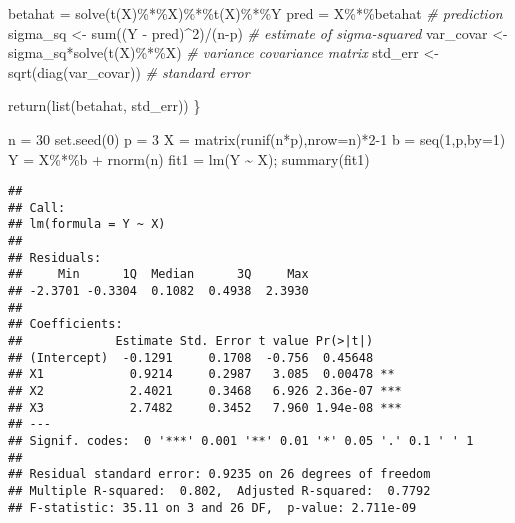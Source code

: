 \documentclass[
  11pt,
]{article}
\newenvironment{Shaded}{\begin{snugshade}}{\end{snugshade}}
\newcommand{\AttributeTok}[1]{\textcolor[rgb]{0.77,0.63,0.00}{#1}}
\newcommand{\CommentTok}[1]{\textcolor[rgb]{0.56,0.35,0.01}{\textit{#1}}}
\newcommand{\DecValTok}[1]{\textcolor[rgb]{0.00,0.00,0.81}{#1}}
\newcommand{\FunctionTok}[1]{\textcolor[rgb]{0.00,0.00,0.00}{#1}}
\newcommand{\NormalTok}[1]{#1}
\newcommand{\OtherTok}[1]{\textcolor[rgb]{0.56,0.35,0.01}{#1}}
\newcommand{\SpecialCharTok}[1]{\textcolor[rgb]{0.00,0.00,0.00}{#1}}
\begin{document}
\begin{Shaded}
\begin{Highlighting}[]
\NormalTok{  betahat }\OtherTok{=} \FunctionTok{solve}\NormalTok{(}\FunctionTok{t}\NormalTok{(X)}\SpecialCharTok{\%*\%}\NormalTok{X)}\SpecialCharTok{\%*\%}\FunctionTok{t}\NormalTok{(X)}\SpecialCharTok{\%*\%}\NormalTok{Y}
\NormalTok{  pred }\OtherTok{=}\NormalTok{ X}\SpecialCharTok{\%*\%}\NormalTok{betahat }\CommentTok{\# prediction}
\NormalTok{  sigma\_sq }\OtherTok{\textless{}{-}} \FunctionTok{sum}\NormalTok{((Y }\SpecialCharTok{{-}}\NormalTok{ pred)}\SpecialCharTok{\^{}}\DecValTok{2}\NormalTok{)}\SpecialCharTok{/}\NormalTok{(n}\SpecialCharTok{{-}}\NormalTok{p)  }\CommentTok{\# estimate of sigma{-}squared}
\NormalTok{  var\_covar }\OtherTok{\textless{}{-}}\NormalTok{ sigma\_sq}\SpecialCharTok{*}\FunctionTok{solve}\NormalTok{(}\FunctionTok{t}\NormalTok{(X)}\SpecialCharTok{\%*\%}\NormalTok{X) }\CommentTok{\# variance covariance matrix}
\NormalTok{  std\_err }\OtherTok{\textless{}{-}} \FunctionTok{sqrt}\NormalTok{(}\FunctionTok{diag}\NormalTok{(var\_covar)) }\CommentTok{\# standard error}
  
  \FunctionTok{return}\NormalTok{(}\FunctionTok{list}\NormalTok{(betahat, std\_err))}
\NormalTok{\}}
\end{Highlighting}
\end{Shaded}

\begin{Shaded}
\begin{Highlighting}[]
\NormalTok{n }\OtherTok{=} \DecValTok{30}
\FunctionTok{set.seed}\NormalTok{(}\DecValTok{0}\NormalTok{)}
\NormalTok{p }\OtherTok{=} \DecValTok{3}
\NormalTok{X }\OtherTok{=} \FunctionTok{matrix}\NormalTok{(}\FunctionTok{runif}\NormalTok{(n}\SpecialCharTok{*}\NormalTok{p),}\AttributeTok{nrow=}\NormalTok{n)}\SpecialCharTok{*}\DecValTok{2{-}1}
\NormalTok{b }\OtherTok{=} \FunctionTok{seq}\NormalTok{(}\DecValTok{1}\NormalTok{,p,}\AttributeTok{by=}\DecValTok{1}\NormalTok{)}
\NormalTok{Y }\OtherTok{=}\NormalTok{ X}\SpecialCharTok{\%*\%}\NormalTok{b }\SpecialCharTok{+} \FunctionTok{rnorm}\NormalTok{(n)}
\NormalTok{fit1 }\OtherTok{=} \FunctionTok{lm}\NormalTok{(Y }\SpecialCharTok{\textasciitilde{}}\NormalTok{ X); }\FunctionTok{summary}\NormalTok{(fit1)}
\end{Highlighting}
\end{Shaded}

\begin{verbatim}
## 
## Call:
## lm(formula = Y ~ X)
## 
## Residuals:
##     Min      1Q  Median      3Q     Max 
## -2.3701 -0.3304  0.1082  0.4938  2.3930 
## 
## Coefficients:
##             Estimate Std. Error t value Pr(>|t|)    
## (Intercept)  -0.1291     0.1708  -0.756  0.45648    
## X1            0.9214     0.2987   3.085  0.00478 ** 
## X2            2.4021     0.3468   6.926 2.36e-07 ***
## X3            2.7482     0.3452   7.960 1.94e-08 ***
## ---
## Signif. codes:  0 '***' 0.001 '**' 0.01 '*' 0.05 '.' 0.1 ' ' 1
## 
## Residual standard error: 0.9235 on 26 degrees of freedom
## Multiple R-squared:  0.802,  Adjusted R-squared:  0.7792 
## F-statistic: 35.11 on 3 and 26 DF,  p-value: 2.711e-09
\end{verbatim}
\end{document}
